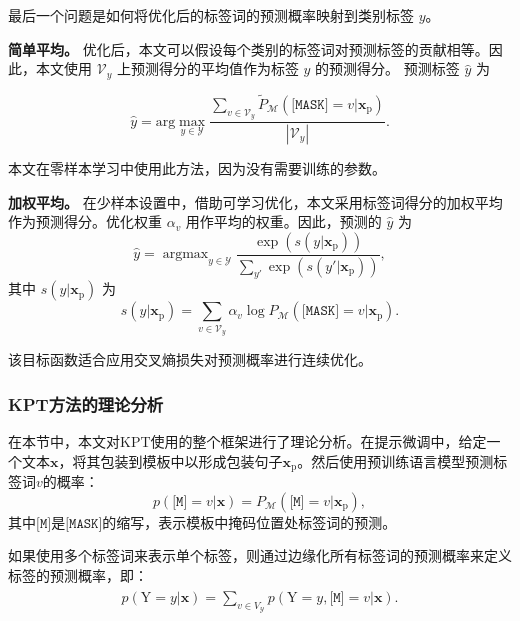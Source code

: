 最后一个问题是如何将优化后的标签词的预测概率映射到类别标签 $y$。

\textbf{简单平均。} 优化后，本文可以假设每个类别的标签词对预测标签的贡献相等。因此，本文使用 $\mathcal{V}_y$ 上预测得分的平均值作为标签 $y$ 的预测得分。
预测标签 $\hat{y}$ 为

\begin{equation}
\hat{y}\!=\!
    \mathrm{arg}\!\max_{y\in\mathcal{Y}}\frac{\sum_{v \in \mathcal{V}_{y}}\! \tilde{P}_{\mathcal{M}}(\!\texttt{[MASK]}=v|\mathbf{x}_{\text{p}})}{|\mathcal{V}_y|}.
\end{equation}

本文在零样本学习中使用此方法，因为没有需要训练的参数。

\textbf{加权平均。} 在少样本设置中，借助可学习优化，本文采用标签词得分的加权平均作为预测得分。优化权重 $\alpha_v$ 用作平均的权重。因此，预测的 $\hat{y}$ 为
\begin{equation}
\hat{y} \!= \operatorname{argmax}_{y\in\mathcal{Y}} \frac{\exp\left({s(y|\mathbf{x}_{\text{p}})}\right)}{\sum_{y'}\exp\left({s({y'}|\mathbf{x}_{\text{p}})}\right)},
\end{equation}
其中 $s(y|\mathbf{x}_{\text{p}})$ 为
\begin{equation}
        s(y|\mathbf{x}_{\text{p}})\!=\!\! \sum_{v\in\mathcal{V}_y} \!\!\alpha_v  \operatorname{log}{P}_{\mathcal{M}}(\texttt{[MASK]}\!\!\!=\!v|\mathbf{x}_{\text{p}}).
\end{equation}

该目标函数适合应用交叉熵损失对预测概率进行连续优化。


\subsubsection{KPT方法的理论分析}

在本节中，本文对KPT使用的整个框架进行了理论分析。在提示微调中，给定一个文本$\mathbf{x}$，将其包装到模板中以形成包装句子$\mathbf{x}_{\text{p}}$。然后使用预训练语言模型预测标签词$v$的概率：
\begin{equation}
    p(\texttt{[M]}\!\!\!=\!v|\mathbf{x}) = P_{\mathcal{M}}(\texttt{[M]}\!\!\!=\!v|\mathbf{x}_{\text{p}}),
\end{equation}
其中$\texttt{[M]}$是$\texttt{[MASK]}$的缩写，表示模板中掩码位置处标签词的预测。

如果使用多个标签词来表示单个标签，则通过边缘化所有标签词的预测概率来定义标签的预测概率，即：
\begin{align}
\begin{split}
  p(\text{Y}\!=\!y|\mathbf{x}) \!=\!\! \sum_{v\in V_{\mathcal{Y}}} p(\text{Y}\!=\!y, \texttt{[M]}\!\!\!=\!v|\mathbf{x}).
\end{split}
\label{appequ_1}
\end{align}

